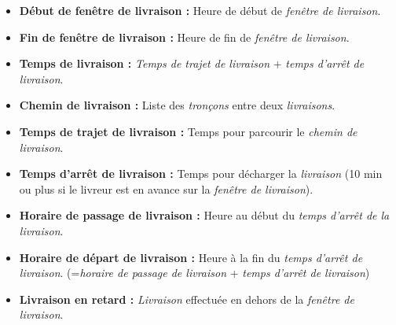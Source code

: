 \documentclass[10pt,a4paper]{book}
\begin{document}
\begin{itemize}
\item \textbf{Début de fenêtre de livraison :} Heure de début de \textit{fenêtre de livraison}. \vskip1mm
\item \textbf{Fin de fenêtre de livraison :} Heure de fin de \textit{fenêtre de livraison}. \vskip1mm
\item \textbf{Temps de livraison :} \textit{Temps de trajet de livraison} + \textit{temps d'arrêt de livraison}. \vskip1mm
\item \textbf{Chemin de livraison :} Liste des \textit{tronçons} entre deux \textit{livraisons}. \vskip1mm
\item \textbf{Temps de trajet de livraison :} Temps pour parcourir le \textit{chemin de livraison}. \vskip1mm
\item \textbf{Temps d'arrêt de livraison :} Temps pour décharger la \textit{livraison} (10 min ou plus si le livreur est en avance sur la \textit{fenêtre de livraison}). \vskip1mm
\item \textbf{Horaire de passage de livraison :} Heure au début du \textit{temps d'arrêt de la livraison}. \vskip1mm
\item \textbf{Horaire de départ de livraison :} Heure à la fin du \textit{temps d'arrêt de livraison}. (=\textit{horaire de passage de livraison} + \textit{temps d'arrêt de livraison}) \vskip1mm
\item \textbf{Livraison en retard :} \textit{Livraison} effectuée en dehors de la \textit{fenêtre de livraison}. \vskip1mm
\end{itemize}
\end{document}
